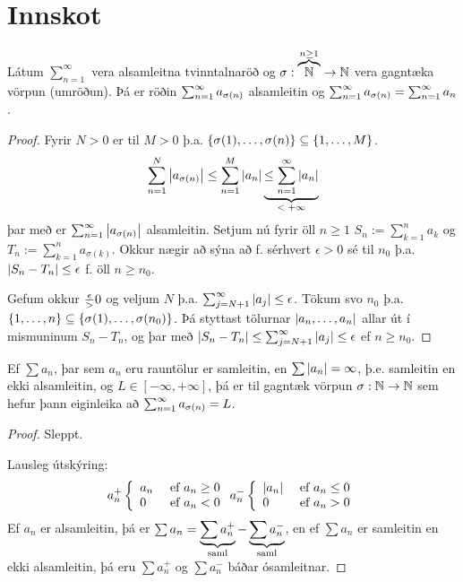 \documentclass[12pt]{book}
\begin{document}
\section*{Innskot}

\begin{setn}
Látum $\sum_{n=1}^{\infty}$ vera alsamleitna tvinntalnaröð og $\sigma: \overbrace{\mathbb{N}}^{n \geq 1} \to \mathbb{N}$ vera gagntæka vörpun (umröðun). Þá er röðin $\sum_{n = {1}}^{\infty} a_{\sigma(n)}$ alsamleitin og $\sum_{n = {1}}^{\infty} a_{\sigma(n)} = \sum_{n = 1}^{\infty} a_n$.
\end{setn}
\begin{proof}
Fyrir $N > 0$ er til $M > 0$ þ.a. $\{\sigma(1), \dotsc, \sigma(n)\} \subseteq \{1, \dotsc, M\}$.
\[\sum_{n=1}^{N}  \left|a_{\sigma(n)}\right|
\leq \sum_{n = 1}^M \left|a_n\right|
\underbrace{\leq \sum_{n = {1}}^{\infty} \left|a_n\right|}_{\text{$< +\infty$}}
\]
þar með er $\sum_{n = 1}^{\infty} \left|a_{\sigma(n)}\right|$ alsamleitin.
Setjum nú fyrir öll $n \geq 1$ $S_n := \sum_{k=1}^n a_k$ og $T_n := \sum_{k=1}^n a_{\sigma(k)}$.
Okkur nægir að sýna að f. sérhvert $\epsilon > 0$ sé til $n_0$ þ.a. $\left|S_n - T_n\right| \leq \epsilon$ f. öll $n \geq n_0$.

Gefum okkur $\frac{\epsilon} > 0$ og veljum $N$ þ.a. $\sum_{j = N+1}^{\infty} \left|a_j\right| \leq \epsilon$. Tökum svo $n_0$ þ.a. $ \{1, \dotsc, n\} \subseteq \{\sigma(1), \dotsc, \sigma(n_0)\}$. Þá styttast tölurnar $\left|a_n, \dotsc, a_n\right|$ allar út í mismuninum $S_n - T_n$, og þar með $\left|S_n - T_n\right| \leq \sum_{j = N+1}^{\infty} \left|a_j\right|  \leq \epsilon$ ef $n \geq n_0$.
\end{proof}

\begin{setn}
Ef $\sum a_n$, þar sem $a_n$ eru rauntölur er samleitin, en $\sum \left|a_n\right| = \infty$, þ.e.
samleitin en ekki alsamleitin, og $L \in [-\infty, +\infty]$, þá er til gagntæk vörpun
$\sigma: \mathbb{N} \to \mathbb{N}$ sem hefur þann eiginleika að $\sum_{n = 1}^{\infty} a_{\sigma(n)} = L$.
\end{setn}
\begin{proof} Sleppt.

Lausleg útskýring:
\[a_n^+ \left\{ \begin{array}{l l} a_n & \text{ ef } a_n \geq 0 \\ 0 & \text{ ef } a_n < 0 \end{array} \right. 
a_n^- \left\{ \begin{array}{l l} \left|a_n\right| & \text{ ef } a_n \leq 0 \\ 0 & \text{ ef } a_n > 0 \end{array} \right.
\]
Ef $a_n$ er alsamleitin, þá er $\sum a_n = \underbrace{\sum a_n^+}_{\text{saml}} - \underbrace{\sum a_n^-}_{\text{saml}}$,
en ef $\sum a_n$ er samleitin en ekki alsamleitin, þá eru $\sum a_n^+$ og $\sum a_n^-$ báðar ósamleitnar.

\end{proof}
\end{document}
